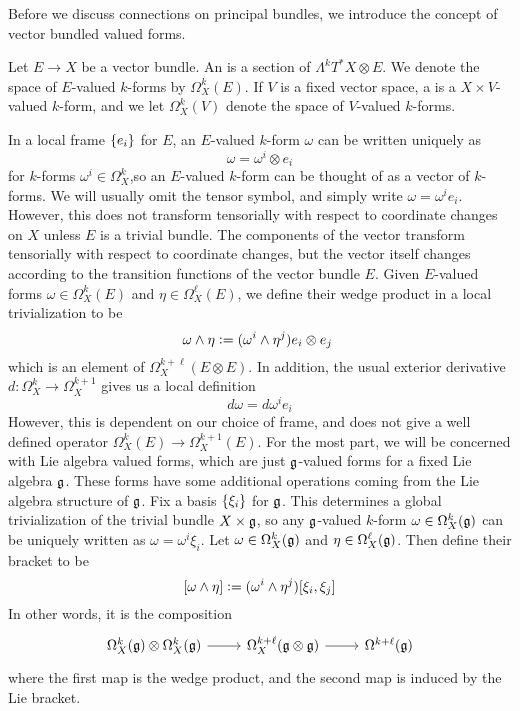 Before we discuss connections on principal bundles, we introduce the concept of
vector bundled valued forms.
%
\begin{defn}
Let $E \to X$ be a vector bundle. An  is
a section of $\Lambda^kT^*X\otimes E$. We denote the space of $E$-valued $k$-forms
by $\Omega^k_X(E)$. If $V$ is a fixed vector space, a  is a $X\times V$-valued $k$-form, and we let $\Omega^k_X(V)$ denote the
space of $V$-valued $k$-forms.
\end{defn}
%
In a local frame $\left\lbrace e_i \right\rbrace$ for $E$, an $E$-valued $k$-form $\omega$ can be
written uniquely as
\[
\omega = \omega^i \otimes e_i
\]
for $k$-forms $\omega^i \in \Omega^k_X$,so an $E$-valued $k$-form can be thought of
as a vector of $k$-forms. We will usually omit the tensor symbol, and simply
write $\omega = \omega^ie_i$. However, this does not transform tensorially with
respect to coordinate changes on $X$ unless $E$ is a trivial bundle. The
components of the vector transform tensorially with respect to coordinate changes,
but the vector itself changes according to the transition functions of the vector
bundle $E$. Given $E$-valued forms $\omega \in \Omega^k_X(E)$ and
$\eta \in \Omega^\ell_X(E)$, we define their wedge product in a local trivialization to
be
\[
\omega \wedge \eta \vcentcolon=  (\omega^i \wedge \eta^j)e_i \otimes e_j\
\]
which is an element of $\Omega^{k+\ell}_X(E \otimes E)$. In addition, the usual
exterior derivative $d : \Omega^k_X \to \Omega^{k+1}_X$ gives us a local
definition
\[
d\omega = d\omega^ie_i
\]
However, this is dependent on our choice of frame, and does not give a well
defined operator $\Omega^k_X(E) \to \Omega^{k+1}_X(E)$.
For the most part, we will be concerned with Lie algebra valued forms,
which are just $\mathfrak{g}$-valued forms for a fixed Lie algebra $\mathfrak{g}$. These
forms have some additional operations coming from the Lie algebra structure
of $\mathfrak{g}$. Fix a basis $\left\lbrace \xi_i \right\rbrace$ for $\mathfrak{g}$. This determines a global
trivialization of the trivial bundle $X \times \mathfrak{g}$, so any $\mathfrak{g}$-valued
$k$-form $\omega \in \Omega^k_X(\mathfrak{g})$ can be uniquely written as
$\omega = \omega^i\xi_i$. Let
$\omega \in \Omega^k_X(\mathfrak{g})$ and $\eta \in \Omega^\ell_X(\mathfrak{g})$. Then define their
bracket to be
\[
[\omega\wedge\eta] \vcentcolon= (\omega^i \wedge \eta^j)[\xi_i,\xi_j]
\]
In other words, it is the composition
\[\begin{tikzcd}
\Omega^k_X(\g) \otimes \Omega^k_X(\g) \ar[r] & \Omega^{k+\ell}_X(\g \otimes \g) \ar[r] &
\Omega^{k+\ell}(\g)
\end{tikzcd}\]
where the first map is the wedge product, and the second map is induced by the
Lie bracket. \\


